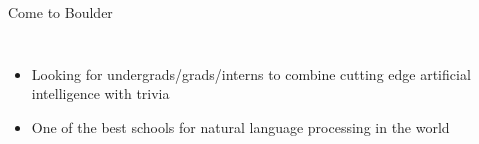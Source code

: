 \documentclass[compress]{beamer}
\begin{document}
\begin{frame}{Come to Boulder}

\begin{columns}
		\begin{itemize}
			\item Looking for undergrads/grads/interns to combine cutting edge artificial intelligence with trivia
			\item One of the best schools for natural language processing in the world
		\end{itemize}
\end{columns}

\end{frame}
\end{document}
